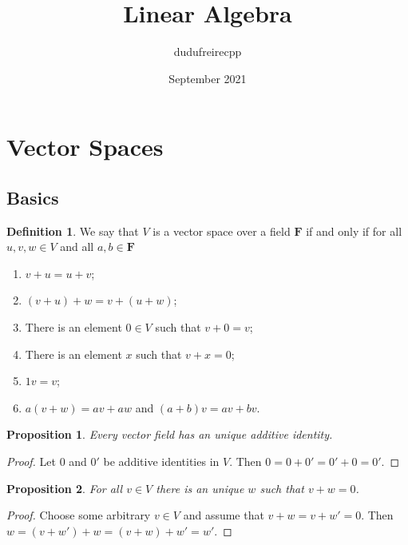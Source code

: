 \documentclass{article}
\title{Linear Algebra}
\author{dudufreirecpp }
\date{September 2021}
\newtheorem{proposition}{Proposition}[subsection]
\theoremstyle{definition}
\newtheorem{definition}{Definition}[subsection]
\theoremstyle{remark}
\begin{document}
\maketitle

\section{Vector Spaces}

\subsection{Basics}

\begin{definition}
    We say that $V$ is a vector space over a field $\mathbf{F}$ if and only if for all $u, v, w \in V$ and all $a, b \in \mathbf{F}$
    
    \begin{enumerate}
        \item $v + u = u + v$;
        \item $(v + u) + w = v + (u + w)$;
        \item There is an element $0 \in V$ such that $v + 0 = v$;
        \item There is an element $x$ such that $v + x = 0$;
        \item $1v = v$;
        \item $a(v + w) = a v + a w$ and $(a+b)v = a v + b v$.
    \end{enumerate}
    
\end{definition}

\begin{proposition}
    Every vector field has an unique additive identity.
\end{proposition}

\begin{proof}
    Let $0$ and $0'$ be additive identities in $V$. Then $0 = 0 + 0' = 0' + 0 = 0'$.
\end{proof}

\begin{proposition}
    For all $v \in V$ there is an unique $w$ such that $v + w = 0$.
\end{proposition}

\begin{proof}
    Choose some arbitrary $v \in V$ and assume that $v + w = v + w' = 0$. Then $w = (v + w') + w = (v + w) + w' = w'$.
\end{proof}
\end{document}
